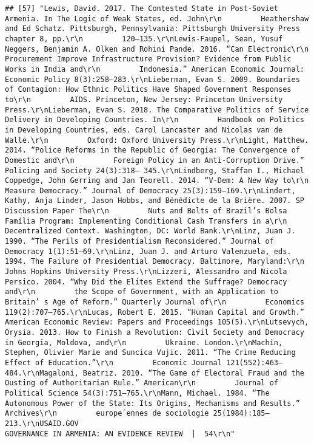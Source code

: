 \documentclass[
]{article}
\begin{document}
\begin{verbatim}
## [57] "Lewis, David. 2017. The Contested State in Post-Soviet Armenia. In The Logic of Weak States, ed. John\r\n         Heathershaw and Ed Schatz. Pittsburgh, Pennsylvania: Pittsburgh University Press chapter 8, pp.\r\n         120–135.\r\nLewis-Faupel, Sean, Yusuf Neggers, Benjamin A. Olken and Rohini Pande. 2016. “Can Electronic\r\n         Procurement Improve Infrastructure Provision? Evidence from Public Works in India and\r\n         Indonesia.” American Economic Journal: Economic Policy 8(3):258–283.\r\nLieberman, Evan S. 2009. Boundaries of Contagion: How Ethnic Politics Have Shaped Government Responses to\r\n         AIDS. Princeton, New Jersey: Princeton University Press.\r\nLieberman, Evan S. 2018. The Comparative Politics of Service Delivery in Developing Countries. In\r\n         Handbook on Politics in Developing Countries, eds. Carol Lancaster and Nicolas van de Walle.\r\n         Oxford: Oxford University Press.\r\nLight, Matthew. 2014. “Police Reforms in the Republic of Georgia: The Convergence of Domestic and\r\n         Foreign Policy in an Anti-Corruption Drive.” Policing and Society 24(3):318– 345.\r\nLindberg, Staffan I., Michael Coppedge, John Gerring and Jan Teorell. 2014. “V-Dem: A New Way to\r\n         Measure Democracy.” Journal of Democracy 25(3):159–169.\r\nLindert, Kathy, Anja Linder, Jason Hobbs, and Bénédicte de la Brière. 2007. SP Discussion Paper The\r\n         Nuts and Bolts of Brazil’s Bolsa Família Program: Implementing Conditional Cash Transfers in a\r\n         Decentralized Context. Washington, DC: World Bank.\r\nLinz, Juan J. 1990. “The Perils of Presidentialism Reconsidered.” Journal of Democracy 1(1):51–69.\r\nLinz, Juan J. and Arturo Valenzuela, eds. 1994. The Failure of Presidential Democracy. Baltimore, Maryland:\r\n         Johns Hopkins University Press.\r\nLizzeri, Alessandro and Nicola Persico. 2004. “Why Did the Elites Extend the Suffrage? Democracy and\r\n         the Scope of Government, with an Application to Britain’ s Age of Reform.” Quarterly Journal of\r\n         Economics 119(2):707–765.\r\nLucas, Robert E. 2015. “Human Capital and Growth.” American Economic Review: Papers and Proceedings 105(5).\r\nLutsevych, Orysia. 2013. How to Finish a Revolution: Civil Society and Democracy in Georgia, Moldova, and\r\n         Ukraine. London.\r\nMachin, Stephen, Olivier Marie and Suncica Vujic. 2011. “The Crime Reducing Effect of Education.”\r\n         Economic Journal 121(552):463–484.\r\nMagaloni, Beatriz. 2010. “The Game of Electoral Fraud and the Ousting of Authoritarian Rule.” American\r\n         Journal of Political Science 54(3):751–765.\r\nMann, Michael. 1984. “The Autonomous Power of the State: Its Origins, Mechanisms and Results.” Archives\r\n         europe´ennes de sociologie 25(1984):185–213.\r\nUSAID.GOV                                                    GOVERNANCE IN ARMENIA: AN EVIDENCE REVIEW  |  54\r\n"                                                                                                                                                                                                                                                                                                                                                                                                        
\end{verbatim}
\end{document}
